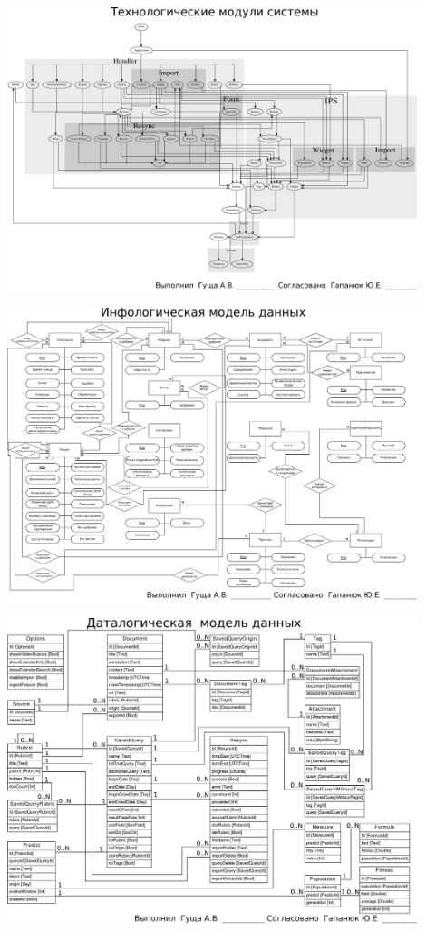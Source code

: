 \documentclass[russian,utf8, a1paper, emptystyle]{eskdgraph}
\begin{document}
\begin{ESKDdrawing}
\includegraphics[width=0.90\textwidth]{lists/list4}
\end{ESKDdrawing}

\begin{ESKDdrawing}
\includegraphics[width=0.90\textwidth]{lists/list5}
\end{ESKDdrawing}

\begin{ESKDdrawing}
\includegraphics[width=0.90\textwidth]{lists/list6}
\end{ESKDdrawing}
\end{document}
